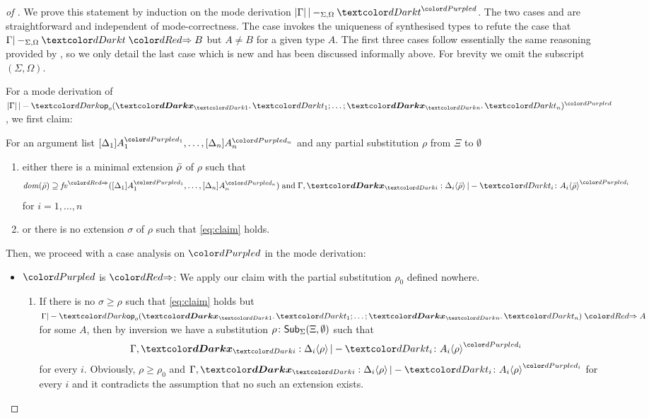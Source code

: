 \begin{proof}[of {}]
  We prove this statement by induction on the mode derivation\/ $\erase{\Gamma} |-_{\Sigma, \Omega} \isTerm{t}^{\dir{d}}$.
  The two cases  and  are straightforward and independent of mode-correctness.
  The case  invokes the uniqueness of synthesised types to refute the case that $\Gamma |-_{\Sigma, \Omega} \isTerm{t} \syn B$ but $A \neq B$ for a given type $A$.
  The first three cases follow essentially the same reasoning provided by \citet{Wadler2022}, so we only detail the last case  which is new and has been discussed informally above.
  For brevity we omit the subscript $(\Sigma, \Omega)$.

      For a mode derivation of $\erase{\Gamma} |- \tmOpts^{\dir{d}}$, we first claim:
      \begin{claim}\label{lem:args-induction}
        For an argument list $\biargs$ and any partial substitution $\rho$ from $\Xi$ to $\emptyset$
        \begin{enumerate}
          \item either there is a minimal extension $\bar{\rho}$ of $\rho$ such that 
            \begin{equation} \label{eq:claim}
              \dom(\ext{\rho}) \supseteq \synvar(\biargs)
              \;\text{and}\;
              \Gamma, \vars{x}_\isTerm{i} : \simsub{\Delta_i}{\ext{\rho}} |- \isTerm{t_i} \colon \simsub{A_i}{\ext{\rho}}^{\dir{d_i}}
            \end{equation}
            for $i = 1, \ldots, n$
          \item or there is no extension $\sigma$ of $\rho$ such that \eqref{eq:claim} holds.
        \end{enumerate}
      \end{claim}

      Then, we proceed with a case analysis on $\dir{d}$ in the mode derivation:
      \begin{itemize}
        \item $\dir{d}$ is $\syn$: We apply our claim with the partial substitution $\rho_0$ defined nowhere.
          \begin{enumerate}
            \item If there is no $\sigma \geq \rho$ such that \eqref{eq:claim} holds but $\Gamma |- \tmOpts \syn A$ for some $A$, then by inversion we have a substitution $\rho\colon \mathsf{Sub}_{\Sigma}(\Xi,\emptyset)$ such that
              \[
                \Gamma, \vars{x}_\isTerm{i} : \simsub{\Delta_i}{\rho} |- \isTerm{t_i} \colon \simsub{A_i}{\rho}^{\dir{d_i}}
              \]
              for every $i$.
              Obviously, $\rho \geq \rho_0$ and ${\Gamma, \vars{x}_\isTerm{i} : \simsub{\Delta_i}{\rho} |- \isTerm{t_i} \colon \simsub{A_i}{\rho}^{\dir{d_i}}}$ for every $i$ and it contradicts the assumption that no such an extension exists.


\end{enumerate}
\end{itemize}
\end{proof}
